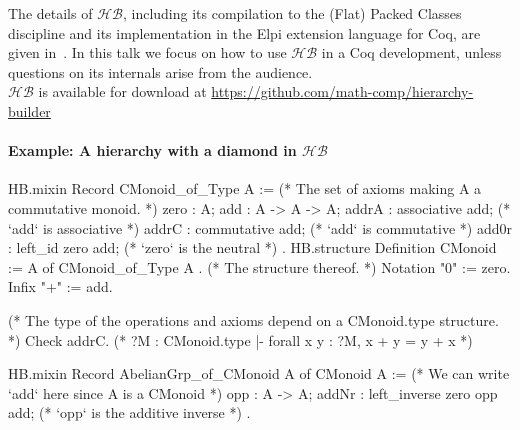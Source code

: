 \documentclass{easychair}
\newcommand{\HB}{\ensuremath{\mathcal{HB}}}
\begin{document}
The details of \HB{}, including its compilation to the (Flat) Packed Classes
discipline and its implementation in the Elpi extension language for Coq,
are given in~\cite{cohen:hal-02478907}.
In this talk we focus on how to use \HB{} in a Coq development,
unless questions on its internals arise from the audience.\\
\HB{} is available for download at \url{https://github.com/math-comp/hierarchy-builder}

\paragraph{Example: A hierarchy with a diamond in \HB{}}

\begin{coqcode}
HB.mixin Record CMonoid_of_Type A := { (* The set of axioms making A a commutative monoid. *)
  zero  : A;
  add   : A -> A -> A;
  addrA : associative add;  (* `add` is associative  *)
  addrC : commutative add;  (* `add` is commutative  *)
  add0r : left_id zero add; (* `zero` is the neutral *)
}.
HB.structure Definition CMonoid := { A of CMonoid_of_Type A }. (* The structure thereof. *)
Notation "0" := zero.
Infix    "+" := add.

(* The type of the operations and axioms depend on a CMonoid.type structure. *)
Check addrC. (* ?M : CMonoid.type |- forall x y : ?M, x + y = y + x *)

HB.mixin Record AbelianGrp_of_CMonoid A of CMonoid A := {
  (* We can write `add` here since A is a  CMonoid   *)
  opp   : A -> A;
  addNr : left_inverse zero opp add; (* `opp` is the additive inverse *)
}.
\end{coqcode}

\newpage
\end{document}
